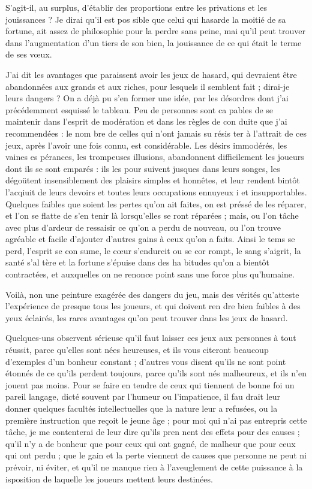 S'agit-il, au surplus, d'établir des
proportions entre les privations et
les jouissances ? Je dirai qu'il est pos%
sible que celui qui hasarde la moitié
de sa fortune, ait assez de philosophie
pour la perdre sans peine, mai qu'il
peut trouver dans l'augmentation
d'un tiers de son bien, la jouissance
de ce qui était le terme de ses v{\oe}ux.

J'ai dit les avantages que paraissent
avoir les jeux de hasard, qui devraient
être abandonnées aux grands et aux
riches, pour lesquels il semblent fait ;
dirai-je leurs dangers ? On a déjà pu
s'en former une idée, par les désordres
dont j'ai précédemment esquissé le
tableau. Peu de personnes sont ca%
pables de se maintenir dans l'esprit de
modération et dans les règles de con%
duite que j'ai recommendées : le nom%
bre de celles qui n'ont jamais su résis%
ter à l'attrait de ces jeux, après l'avoir
une fois connu, est considérable.
Les désirs immodérés, les vaines es%
pérances, les trompeuses illusions,
abandonnent difficilement les joueurs
dont ils se sont emparés : ils les pour%
suivent jusques dans leurs songes, les
dégoütent insensiblement des plaisirs
simples et honnêtes, et leur rendent
bintôt l'acqiuit de leurs devoirs et
toutes leurs occupations ennuyeux i
et insupportables. Quelques faibles
que soient les pertes qu'on ait faites,
on est préssé de les réparer, et l'on se
flatte de s'en tenir là lorsqu'elles se%
ront réparées ; mais, ou l'on tâche
avec plus d'ardeur de ressaisir ce
qu'on a perdu de nouveau, ou l'on
trouve agréable et facile d'ajouter
d'autres gains à ceux qu'on a faits.
Ainsi le tems se perd, l'esprit se con%
sume, le c{\oe}ur s'endurcit ou se cor%
rompt, le sang s'aigrit, la santé s'al%
tère et la fortune s'épuise dans des ha%
bitudes qu'on a bientôt contractées,
et auxquelles on ne renonce point
sans une force plus qu'humaine.

Voilà, non une peinture exagérée
des dangers du jeu, mais des vérités
qu'atteste l'expérience de presque
tous les joueurs, et qui doivent ren%
dre bien faibles à des yeux éclairés,
les rares avantages qu'on peut trouver
dans les jeux de hasard.

Quelques-uns observent sérieuse%
qu'il faut laisser ces jeux aux
personnes à tout réussit, parce
qu'elles sont nées heureuses, et ils
vous citeront beaucoup d'exemples
d'un bonheur constant ; d'autres vous
disent qu'ils ne sont point étonnés
de ce qu'ils perdent toujours, parce
qu'ils sont nés malheureux, et ils n'en
jouent pas moins. Pour se faire en%
tendre de ceux qui tiennent de bonne
foi un pareil langage, dicté souvent
par l'humeur ou l'impatience, il fau%
drait leur donner quelques facultés
intellectuelles que la nature leur a
refusées, ou la première instruction
que reçoit le jeune âge ; pour moi qui
n'ai pas entrepris cette tâche, je me
contenterai de leur dire qu'ils pren%
nent des effets pour des causes ; qu'il
n'y a de bonheur que pour ceux qui
ont gagné, de malheur que pour ceux
qui ont perdu ; que le gain et la perte
viennent de causes que personne ne
peut ni prévoir, ni éviter, et qu'il ne
manque rien à l'aveuglement de cette
puissance à la isposition de laquelle
les joueurs mettent leurs destinées.
